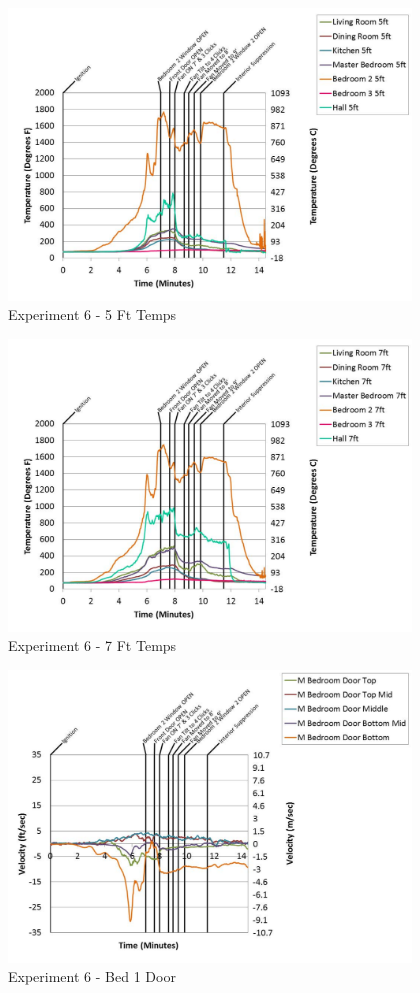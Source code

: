 \documentclass{article}
\begin{document}
\begin{appendices}
	\begin{figure}[h!]
		\centering
		\includegraphics[height=3.05in]{0_Images/Results_Charts/Exp_6_Charts/5FtTemps.pdf}
		\caption{Experiment 6 - 5 Ft Temps}
	\end{figure}
 

	\begin{figure}[h!]
		\centering
		\includegraphics[height=3.05in]{0_Images/Results_Charts/Exp_6_Charts/7FtTemps.pdf}
		\caption{Experiment 6 - 7 Ft Temps}
	\end{figure}
 
	\clearpage

	\begin{figure}[h!]
		\centering
		\includegraphics[height=3.05in]{0_Images/Results_Charts/Exp_6_Charts/Bed1Door.pdf}
		\caption{Experiment 6 - Bed 1 Door}
	\end{figure}
 


\end{appendices}
\end{document}
